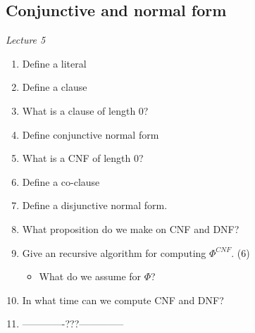 \documentclass[fleqn]{article}
\begin{document}
\subsection{Conjunctive and  normal form}
\textit{Lecture 5}
\begin{enumerate}
    \item Define a literal
    \item Define a clause
    \item What is a clause of length 0?
    \item Define conjunctive normal form
    \item What is a CNF of length 0?
    \item Define a co-clause
    \item Define a disjunctive normal form.
    \item What proposition do we make on CNF and DNF?
    \item Give an recursive algorithm for computing $\Phi^{CNF}$. (6)
    \begin{itemize}
        \item What do we assume for $\Phi$?
    \end{itemize}
    \item In what time can we compute CNF and DNF?
    \item -------------???-------------- 
\end{enumerate}
\end{document}
